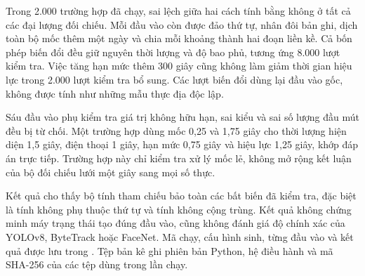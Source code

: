 Trong 2.000 trường hợp đã chạy, sai lệch giữa hai cách tính bằng không ở tất cả các đại lượng đối chiếu. Mỗi đầu vào còn được đảo thứ tự, nhân đôi bản ghi, dịch toàn bộ mốc thêm một ngày và chia mỗi khoảng thành hai đoạn liền kề. Cả bốn phép biến đổi đều giữ nguyên thời lượng và độ bao phủ, tương ứng 8.000 lượt kiểm tra. Việc tăng hạn mức thêm 300 giây cũng không làm giảm thời gian hiệu lực trong 2.000 lượt kiểm tra bổ sung. Các lượt biến đổi dùng lại đầu vào gốc, không được tính như những mẫu thực địa độc lập.

Sáu đầu vào phụ kiểm tra giá trị không hữu hạn, sai kiểu và sai số lượng đầu mút đều bị từ chối. Một trường hợp dùng mốc 0,25 và 1,75 giây cho thời lượng hiện diện 1,5 giây, điện thoại 1 giây, hạn mức 0,75 giây và hiệu lực 1,25 giây, khớp đáp án trực tiếp. Trường hợp này chỉ kiểm tra xử lý mốc lẻ, không mở rộng kết luận của bộ đối chiếu lưới một giây sang mọi số thực.

Kết quả cho thấy bộ tính tham chiếu bảo toàn các bất biến đã kiểm tra, đặc biệt là tính không phụ thuộc thứ tự và tính không cộng trùng. Kết quả không chứng minh máy trạng thái tạo đúng đầu vào, cũng không đánh giá độ chính xác của YOLOv8, ByteTrack hoặc FaceNet. Mã chạy, cấu hình sinh, từng đầu vào và kết quả được lưu trong . Tệp bản kê ghi phiên bản Python, hệ điều hành và mã SHA-256 của các tệp dùng trong lần chạy.

